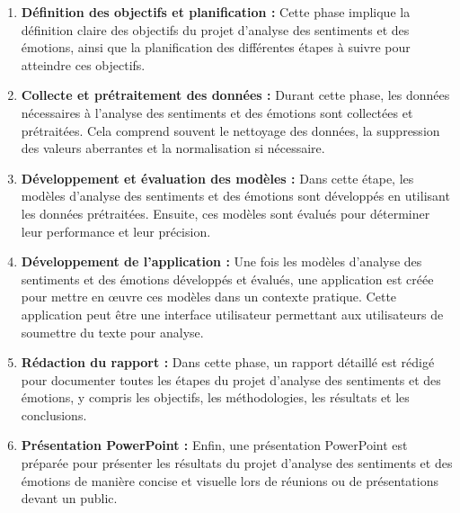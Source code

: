 \begin{enumerate}
    \item \textbf{Définition des objectifs et planification :}
    Cette phase implique la définition claire des objectifs du projet d'analyse des sentiments et des émotions, ainsi que la planification des différentes étapes à suivre pour atteindre ces objectifs.
     
    \item \textbf{Collecte et prétraitement des données :}
    Durant cette phase, les données nécessaires à l'analyse des sentiments et des émotions sont collectées et prétraitées. Cela comprend souvent le nettoyage des données, la suppression des valeurs aberrantes et la normalisation si nécessaire.\
    
    \item \textbf{Développement et évaluation des modèles :}
    Dans cette étape, les modèles d'analyse des sentiments et des émotions sont développés en utilisant les données prétraitées. Ensuite, ces modèles sont évalués pour déterminer leur performance et leur précision.\
   
    \item \textbf{Développement de l'application :}
     Une fois les modèles d'analyse des sentiments et des émotions développés et évalués, une application est créée pour mettre en œuvre ces modèles dans un contexte pratique. Cette application peut être une interface utilisateur permettant aux utilisateurs de soumettre du texte pour analyse.\
  
    \item \textbf{Rédaction du rapport :}
     Dans cette phase, un rapport détaillé est rédigé pour documenter toutes les étapes du projet d'analyse des sentiments et des émotions, y compris les objectifs, les méthodologies, les résultats et les conclusions.
    
    \item \textbf{Présentation PowerPoint :}
    Enfin, une présentation PowerPoint est préparée pour présenter les résultats du projet d'analyse des sentiments et des émotions de manière concise et visuelle lors de réunions ou de présentations devant un public.\
\end{enumerate}


